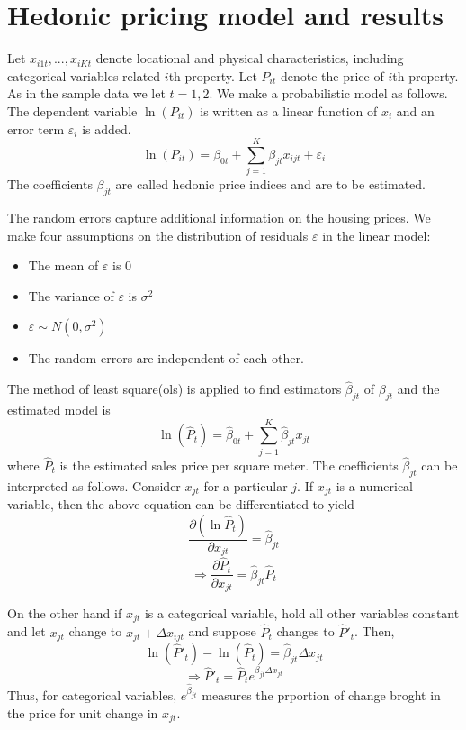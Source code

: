 \documentclass[12pt]{article}
\begin{document}
 
\section{Hedonic pricing model and results}
\label{sec:hed}
Let $x_{i1t}, ..., x_{iKt}$ denote locational and physical characteristics, including categorical variables  related $i$th property. Let $P_{it}$ denote the price of $i$th property. As in the sample data we let $t=1, 2$. We make a probabilistic model as follows. The dependent variable $\ln (P_{it})$ is written as a linear function of $x_i$ and an error term $\varepsilon_i$ is added. 
$$\ln (P_{it})=\beta_{0t}+\sum_{j=1} ^{K} \beta_{jt}x_{ijt} +\varepsilon_i$$
The coefficients $\beta_{jt}$ are called hedonic price indices and are to be estimated.

The random errors capture additional information on the housing prices. We make four assumptions on the distribution of residuals $\varepsilon$ in the linear model:
\begin{itemize}
    \item The mean of $\varepsilon$ is 0
    \item The variance of $\varepsilon$ is $\sigma^2$
    \item $\varepsilon \sim N(0, \sigma^2)$
    \item The random errors are independent of each other.
\end{itemize}

The method of least square(\acrshort{ols}) is applied to find estimators $\hat \beta_{jt}$ of $\beta_{jt}$ and the estimated model is
$$\ln (\hat P_{t})=\hat \beta_{0t}+\sum_{j=1} ^{K} \hat \beta_{jt}x_{jt}$$
where $\hat P_{t}$ is the estimated sales price per square meter.
The coefficients $\hat \beta_{jt}$ can be interpreted as follows. Consider $x_{jt}$ for a particular $j$. If $x_{jt}$ is a numerical variable, then the above equation can be differentiated to yield 
$$\frac{\partial (\ln \hat P_{t})}{\partial x_{jt}}=\hat \beta_{jt}$$
$$\Rightarrow \frac{\partial \hat P_{t}}{\partial x_{jt}}=\hat \beta_{jt} \hat P_{t}$$

On the other hand if $x_{jt}$ is a categorical variable, hold all other variables constant and let $x_{jt}$ change to $x_{jt}+\Delta x_{ijt}$ and suppose $\hat P_t$ changes to $\hat P'_t$. Then, 
$$\ln(\hat P'_t)-\ln(\hat P_t)=\hat \beta_{jt}\Delta x_{jt}$$
$$\Rightarrow \hat P'_t=\hat P_t e^{\beta_{jt}\Delta x_{jt}}$$
Thus, for categorical variables, $e^{\hat \beta_{jt}}$ measures the prportion of change broght in the price for unit change in $x_{jt}$.
\end{document}
